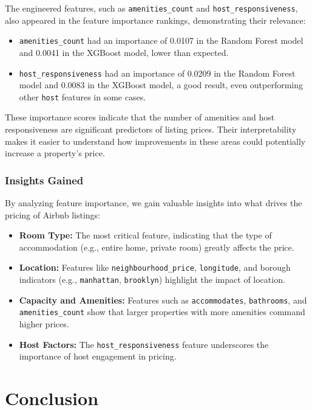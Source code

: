 \documentclass[12pt]{article}
\begin{document}
The engineered features, such as \texttt{amenities\_count} and \texttt{host\_responsiveness}, also appeared in the feature importance rankings, demonstrating their relevance:

\begin{itemize}
    \item \texttt{amenities\_count} had an importance of 0.0107 in the Random Forest model and 0.0041 in the XGBoost model, lower than expected.
    \item \texttt{host\_responsiveness} had an importance of 0.0209 in the Random Forest model and 0.0083 in the XGBoost model, a good result, even outperforming other \texttt{host} features in some cases.
\end{itemize}

These importance scores indicate that the number of amenities and host responsiveness are significant predictors of listing prices. Their interpretability makes it easier to understand how improvements in these areas could potentially increase a property's price.

\subsubsection{Insights Gained}

By analyzing feature importance, we gain valuable insights into what drives the pricing of Airbnb listings:

\begin{itemize}
    \item \textbf{Room Type:} The most critical feature, indicating that the type of accommodation (e.g., entire home, private room) greatly affects the price.
    \item \textbf{Location:} Features like \texttt{neighbourhood\_price}, \texttt{longitude}, and borough indicators (e.g., \texttt{manhattan}, \texttt{brooklyn}) highlight the impact of location.
    \item \textbf{Capacity and Amenities:} Features such as \texttt{accommodates}, \texttt{bathrooms}, and \texttt{amenities\_count} show that larger properties with more amenities command higher prices.
    \item \textbf{Host Factors:} The \texttt{host\_responsiveness} feature underscores the importance of host engagement in pricing.
\end{itemize}

\section{Conclusion}
\end{document}
